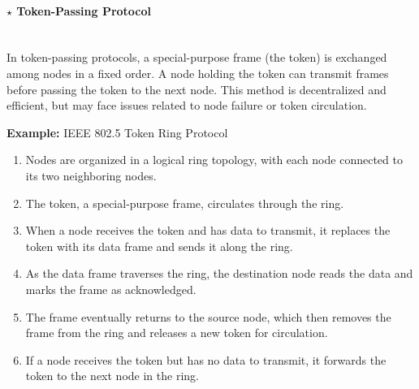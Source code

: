 \paragraph[5.3.3.2 Token-Passing Protocol]{$\pmb{\star}$ Token-Passing Protocol}\mbox{}\\[4pt]
In token-passing protocols, a special-purpose frame (the token) is exchanged among nodes in a fixed order. A node holding the token can transmit frames before passing the token to the next node. This method is decentralized and efficient, but may face issues related to node failure or token circulation.

\vspace{1em}
\noindent \textbf{Example:} IEEE 802.5 Token Ring Protocol
\begin{enumerate}
    \item Nodes are organized in a logical ring topology, with each node connected to its two neighboring nodes.
    \item The token, a special-purpose frame, circulates through the ring.
    \item When a node receives the token and has data to transmit, it replaces the token with its data frame and sends it along the ring.
    \item As the data frame traverses the ring, the destination node reads the data and marks the frame as acknowledged.
    \item The frame eventually returns to the source node, which then removes the frame from the ring and releases a new token for circulation.
    \item If a node receives the token but has no data to transmit, it forwards the token to the next node in the ring.
\end{enumerate}


